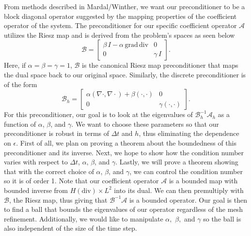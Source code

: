 \documentclass[11pt]{article}
\newcommand{\divv}{\mathrm{div}}
\newcommand{\gradd}{\mathrm{grad}}
\begin{document}

From methods described in Mardal/Winther, we want our preconditioner to be a block diagonal operator suggested by the mapping properties of the coefficient operator of the system. The preconditioner for our specific coefficient operator $\mathscr{A}$ utilizes the Riesz map and is derived from the problem's spaces as seen below
\begin{equation}
\mathscr{B}=\begin{bmatrix}
 \beta\, I -\alpha\,\gradd\,\divv& 0 \\
0 & \gamma\, I
\end{bmatrix}.
\end{equation}
Here, if $\alpha = \beta = \gamma = 1$, $\mathscr{B}$ is the canonical Riesz map preconditioner that maps the dual space back to our original space. %
Similarly, the discrete preconditioner is of the form
\begin{equation}
\mathscr{B}_h=\begin{bmatrix}
\alpha(\nabla \cdot, \nabla \cdot) + \beta(\cdot,\cdot) & 0 \\
0 & \gamma(\cdot, \cdot)
\end{bmatrix}.
\end{equation}
For this preconditioner, our goal is to look at the eigenvalues of $\mathscr{B}_h^{-1}\mathscr{A}_h$ as a function of $\alpha$, $\beta$, and $\gamma$. We want to choose these parameters so that our preconditioner is robust in terms of $\Delta t$ and $h$, thus eliminating the dependence on $\epsilon$. First of all, we plan on proving a theorem about the boundedness of this preconditioner and its inverse. Next, we hope to show how the condition number varies with respect to $\Delta t$, $\alpha$, $\beta$, and $\gamma$. Lastly, we will prove a theorem showing that with the correct choice of $\alpha$, $\beta$, and $\gamma$, we can control the condition number so it is of order 1.
Note that our coefficient operator $\mathscr{A}$  is a bounded map with bounded inverse from $H(\divv) \times L^2$ into its dual. We can then premultiply with $\mathscr{B}$, the Riesz map, thus giving  that $\mathscr{B}^{-1}\mathscr{A}$ is a bounded operator. Our goal is then to find a ball that bounds the eigenvalues of our operator regardless of the mesh refinement. Additionally, we would like to manipulate $\alpha,$ $\beta,$ and $\gamma$ so the ball is also independent of the size of the time step.
\end{document}
